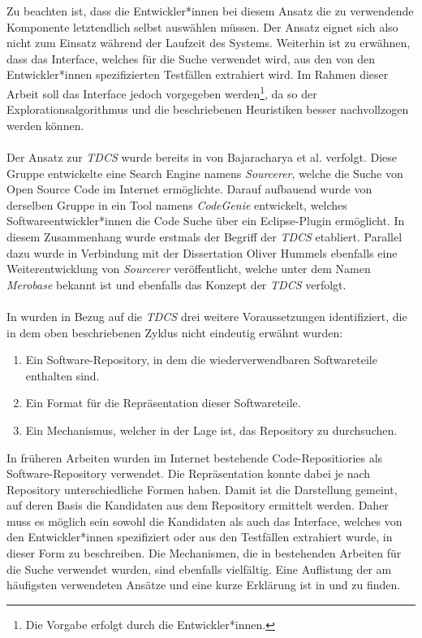 Zu beachten ist, dass die Entwickler*innen bei diesem Ansatz die zu verwendende Komponente letztendlich selbst auswählen müssen. Der Ansatz eignet sich also nicht zum Einsatz während der Laufzeit des Systems. Weiterhin ist zu erwähnen, dass das Interface, welches für die Suche verwendet wird, aus den von den Entwickler*innen spezifizierten Testfällen extrahiert wird. Im Rahmen dieser Arbeit soll das Interface jedoch vorgegeben werden\footnote{Die Vorgabe erfolgt durch die Entwickler*innen.}, da so der Explorationsalgorithmus und die beschriebenen Heuristiken besser nachvollzogen werden können.
\\\\
Der Ansatz zur \emph{TDCS} wurde bereits in \cite{sourcerer} von Bajaracharya et al.  verfolgt. Diese Gruppe entwickelte eine Search \Gls{Engine} namens \emph{Sourcerer}, welche die Suche von Open Source Code im Internet ermöglichte. Darauf aufbauend wurde von derselben Gruppe in \cite{Lemos} ein Tool namens \emph{CodeGenie} entwickelt, welches Softwareentwickler*innen die Code Suche über ein Eclipse-Plugin ermöglicht. In diesem Zusammenhang wurde erstmals der Begriff der \emph{TDCS} etabliert. Parallel dazu wurde in Verbindung mit der Dissertation Oliver Hummels \cite{hummel08} ebenfalls eine Weiterentwicklung von \emph{Sourcerer} veröffentlicht, welche unter dem Namen \emph{Merobase} bekannt ist und ebenfalls das Konzept der \emph{TDCS} verfolgt.
\\\\
In \cite{hummel08} wurden in Bezug auf die \emph{TDCS} drei weitere Voraussetzungen identifiziert, die in dem oben beschriebenen Zyklus nicht eindeutig erwähnt wurden:
\begin{enumerate}
\item Ein Software-Repository, in dem die wiederverwendbaren Softwareteile enthalten sind.
\item Ein Format für die Repräsentation dieser Softwareteile.
\item Ein Mechanismus, welcher in der Lage ist, das Repository zu durchsuchen.
\end{enumerate}
\noindent
In früheren Arbeiten wurden im Internet bestehende Code-Repositiories als Software-Repository verwendet. Die Repräsentation konnte dabei je nach Repository unterschiedliche Formen haben. Damit ist die Darstellung gemeint, auf deren Basis die Kandidaten aus dem Repository ermittelt werden. Daher muss es möglich sein sowohl die Kandidaten als auch das Interface, welches von den Entwickler*innen spezifiziert oder aus den Testfällen extrahiert wurde, in dieser Form zu beschreiben. Die Mechanismen, die in bestehenden Arbeiten für die Suche verwendet wurden, sind ebenfalls vielfältig. Eine Auflistung der am häufigsten verwendeten Ansätze und eine kurze Erklärung ist in \cite{Hummel2013} und \cite{hummel08} zu finden.
